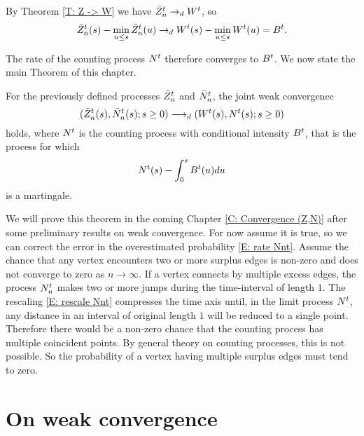 By Theorem \ref{T: Z -> W} we have $\bar{Z}^t_n \rightarrow_d W^t$,
so
\begin{equation}
\bar{Z}^t_n(s) - \min_{u \leq s}\bar{Z}^t_n(u) \rightarrow_d W^t(s) - \min_{u \leq s}W^t(u) = B^t.
\end{equation}

The rate of the counting process $N^t$ therefore converges to $B^t$.
We now state the main Theorem of this chapter.
\begin{theorem}
	For the previously defined processes $\bar{Z}^t_n$ and $\bar{N}_n^t$,
	the joint weak convergence
	\begin{equation}
	( \bar{Z}^t_n(s), \bar{N}_n^t(s); s \geq 0 ) \longrightarrow_d (W^t(s), N^t(s); s \geq 0)
	\end{equation}
	holds, where $N^t$ is the counting process with conditional intensity $B^t$,
	that is the process for which
	\begin{equation*}
	N^t(s) - \int_{0}^s B^t(u)du
	\end{equation*}
	is a martingale.
\end{theorem}

We will prove this theorem in the coming Chapter \ref{C: Convergence (Z,N)} after some preliminary results on weak convergence.
For now assume it is true, so we can correct the error in the overestimated probability \eqref{E: rate Nnt}.
Assume the chance that any vertex encounters two or more surplus edges is non-zero and does not converge to zero as $n \rightarrow \infty$.
If a vertex connects by multiple excess edges, the process $N_n^t$ makes two or more jumps during the time-interval of length $1$.
The rescaling \eqref{E: rescale Nnt} compresses the time axis until, in the limit process $N^t$, 
any distance in an interval of original length $1$ will be reduced to a single point.
Therefore there would be a non-zero chance that the counting process has multiple coincident points.
By general theory on counting processes, this is not possible.
So the probability of a vertex having multiple surplus edges must tend to zero.



\section{On weak convergence}

